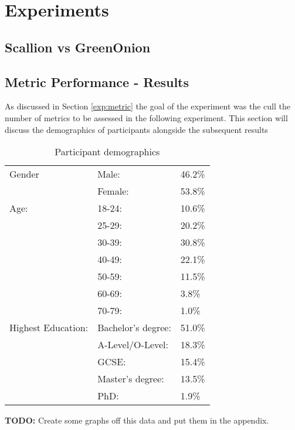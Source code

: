 \chapter{Experiments}
\label{cha:Experiments}

\section{Scallion vs GreenOnion}

\section{Metric Performance - Results}
As discussed in Section \ref{exp:metric} the goal of the experiment was the cull the number of metrics to be assessed in the following experiment. This section will discuss the demographics of participants alongside the subsequent results

\begin{table}[h!]
    \centering
    \begin{tabular}{|l|ll|}
        \hline
        Gender & Male: & 46.2\% \\
               & Female: & 53.8\% \\
        \hline
        Age:   & 18-24: & 10.6\% \\ 
               & 25-29: & 20.2\% \\ 
               & 30-39: & 30.8\% \\ 
               & 40-49: & 22.1\% \\ 
               & 50-59: & 11.5\% \\ 
               & 60-69: & 3.8\% \\ 
               & 70-79: & 1.0\% \\ 
               
        \hline
        Highest Education:  & Bachelor's degree:    & 51.0\% \\
                            & A-Level/O-Level:      & 18.3\% \\
                            & GCSE:                 & 15.4\%  \\
                            & Master's degree:      & 13.5\% \\ 
                            & PhD:                  & 1.9\% \\
        \hline

    \end{tabular}
    \caption{Participant demographics}
    \label{tab:exp1_demo}
\end{table}
\textbf{TODO: } Create some graphs off this data and put them in the appendix.

